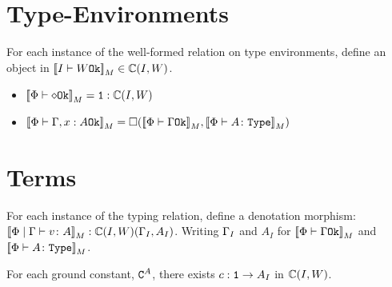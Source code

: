 \documentclass{report}
\begin{document}
\section{Type-Environments}

For each instance of the well-formed relation on type environments, define an object in ${\bf [\![}I\vdash W \texttt{Ok}{\bf ]\!]}_M\in\mathbb{C}(I, W)$.

\begin{itemize}
    \item ${\bf [\![}\Phi\vdash \diamond \texttt{Ok}{\bf ]\!]}_M = \texttt{1}: \mathbb{C}(I, W)$
    \item ${\bf [\![}\Phi\vdash \Gamma, x: A \texttt{Ok}{\bf ]\!]}_M = \square({\bf [\![}\Phi\vdash \Gamma \texttt{Ok}{\bf ]\!]}_M, {\bf [\![}\Phi \vdash A \colon \texttt{Type}{\bf ]\!]}_M)$
\end{itemize}

\section{Terms}
For each instance of the typing relation, define a denotation morphism: ${\bf [\![}\Phi\mid\Gamma \vdash v \colon A{\bf ]\!]}_M: \mathbb{C}(I, W)(\Gamma_I, A_I)$. Writing $\Gamma_I$ and $A_I$ for ${\bf [\![}\Phi\vdash \Gamma \texttt{Ok}{\bf ]\!]}_M$ and ${\bf [\![}\Phi \vdash A \colon \texttt{Type}{\bf ]\!]}_M$.

For each ground constant, $\texttt{C}^{A}$, there exists $c: \texttt{1} \rightarrow A_I$ in $\mathbb{C}(I, W)$.
\end{document}
